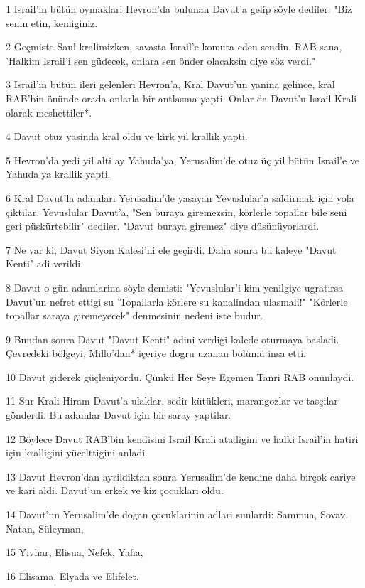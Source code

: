 \par 1 Israil'in bütün oymaklari Hevron'da bulunan Davut'a gelip söyle dediler: "Biz senin etin, kemiginiz.
\par 2 Geçmiste Saul kralimizken, savasta Israil'e komuta eden sendin. RAB sana, 'Halkim Israil'i sen güdecek, onlara sen önder olacaksin diye söz verdi."
\par 3 Israil'in bütün ileri gelenleri Hevron'a, Kral Davut'un yanina gelince, kral RAB'bin önünde orada onlarla bir antlasma yapti. Onlar da Davut'u Israil Krali olarak meshettiler*.
\par 4 Davut otuz yasinda kral oldu ve kirk yil krallik yapti.
\par 5 Hevron'da yedi yil alti ay Yahuda'ya, Yerusalim'de otuz üç yil bütün Israil'e ve Yahuda'ya krallik yapti.
\par 6 Kral Davut'la adamlari Yerusalim'de yasayan Yevuslular'a saldirmak için yola çiktilar. Yevuslular Davut'a, "Sen buraya giremezsin, körlerle topallar bile seni geri püskürtebilir" dediler. "Davut buraya giremez" diye düsünüyorlardi.
\par 7 Ne var ki, Davut Siyon Kalesi'ni ele geçirdi. Daha sonra bu kaleye "Davut Kenti" adi verildi.
\par 8 Davut o gün adamlarina söyle demisti: "Yevuslular'i kim yenilgiye ugratirsa Davut'un nefret ettigi su 'Topallarla körlere su kanalindan ulasmali!" "Körlerle topallar saraya giremeyecek" denmesinin nedeni iste budur.
\par 9 Bundan sonra Davut "Davut Kenti" adini verdigi kalede oturmaya basladi. Çevredeki bölgeyi, Millo'dan* içeriye dogru uzanan bölümü insa etti.
\par 10 Davut giderek güçleniyordu. Çünkü Her Seye Egemen Tanri RAB onunlaydi.
\par 11 Sur Krali Hiram Davut'a ulaklar, sedir kütükleri, marangozlar ve tasçilar gönderdi. Bu adamlar Davut için bir saray yaptilar.
\par 12 Böylece Davut RAB'bin kendisini Israil Krali atadigini ve halki Israil'in hatiri için kralligini yücelttigini anladi.
\par 13 Davut Hevron'dan ayrildiktan sonra Yerusalim'de kendine daha birçok cariye ve kari aldi. Davut'un erkek ve kiz çocuklari oldu.
\par 14 Davut'un Yerusalim'de dogan çocuklarinin adlari sunlardi: Sammua, Sovav, Natan, Süleyman,
\par 15 Yivhar, Elisua, Nefek, Yafia,
\par 16 Elisama, Elyada ve Elifelet.
